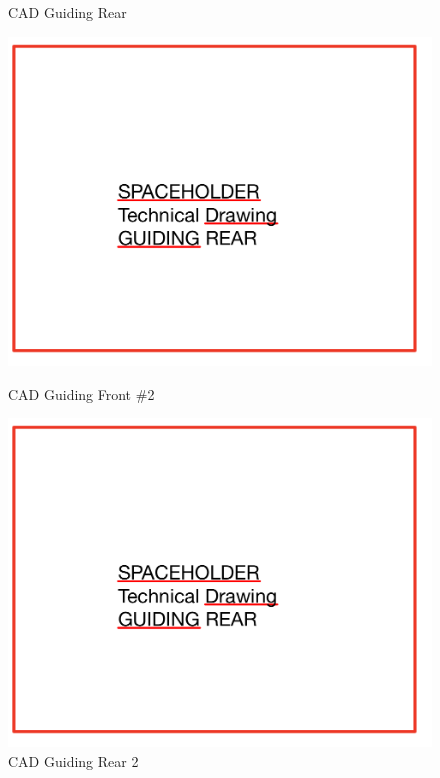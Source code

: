 \begin{figure}[!ht]
\begin{minipage}[b]{0.45\linewidth}
    \caption{CAD Guiding Rear}
    \label{fig:guiding_rear}
  \end{minipage}
\end{figure}

\begin{figure}[!ht]
  \centering
  \begin{minipage}[b]{0.45\linewidth}
    \includegraphics[width=\linewidth]{guiding_tech_rear.jpg}
    \caption{CAD Guiding Front \#2}
    \label{fig:guiding_front_2}
  \end{minipage}
  \hspace{0.5cm}
  \begin{minipage}[b]{0.45\linewidth}
    \includegraphics[width=\linewidth]{guiding_tech_rear.jpg}
    \caption{CAD Guiding Rear 2}
    \label{fig:guiding_rear_2}
  \end{minipage}
\end{figure}

